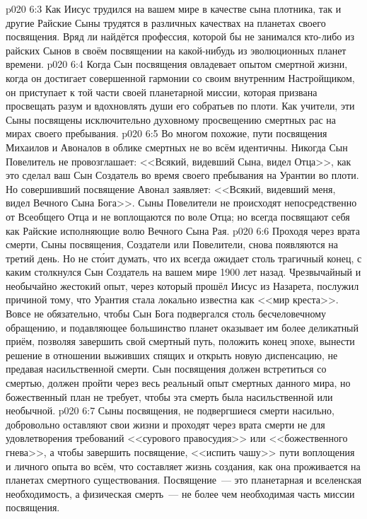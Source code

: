 \vs p020 6:3 Как Иисус трудился на вашем мире в качестве сына плотника, так и другие Райские Сыны трудятся в различных качествах на планетах своего посвящения. Вряд ли найдётся профессия, которой бы не занимался кто\hyp{}либо из райских Сынов в своём посвящении на какой\hyp{}нибудь из эволюционных планет времени.
\vs p020 6:4 Когда Сын посвящения овладевает опытом смертной жизни, когда он достигает совершенной гармонии со своим внутренним Настройщиком, он приступает к той части своей планетарной миссии, которая призвана просвещать разум и вдохновлять души его собратьев по плоти. Как учители, эти Сыны посвящены исключительно духовному просвещению смертных рас на мирах своего пребывания.
\vs p020 6:5 \pc Во многом похожие, пути посвящения Михаилов и Авоналов в облике смертных не во всём идентичны. Никогда Сын Повелитель не провозглашает: <<Всякий, видевший Сына, видел Отца>>, как это сделал ваш Сын Создатель во время своего пребывания на Урантии во плоти. Но совершивший посвящение Авонал заявляет: <<Всякий, видевший меня, видел Вечного Сына Бога>>. Сыны Повелители не происходят непосредственно от Всеобщего Отца и не воплощаются по воле Отца; но всегда посвящают себя как Райские  исполняющие волю Вечного Сына Рая.
\vs p020 6:6 \pc Проходя через врата смерти, Сыны посвящения, Создатели или Повелители, снова появляются на третий день. Но не ст\'оит думать, что их всегда ожидает столь трагичный конец, с каким столкнулся Сын Создатель на вашем мире 1900 лет назад. Чрезвычайный и необычайно жестокий опыт, через который прошёл Иисус из Назарета, послужил причиной тому, что Урантия стала локально известна как <<мир креста>>. Вовсе не обязательно, чтобы Сын Бога подвергался столь бесчеловечному обращению, и подавляющее большинство планет оказывает им более деликатный приём, позволяя завершить свой смертный путь, положить конец эпохе, вынести решение в отношении выживших спящих и открыть новую диспенсацию, не предавая насильственной смерти. Сын посвящения должен встретиться со смертью, должен пройти через весь реальный опыт смертных данного мира, но божественный план не требует, чтобы эта смерть была насильственной или необычной.
\vs p020 6:7 Сыны посвящения, не подвергшиеся смерти насильно, добровольно оставляют свои жизни и проходят через врата смерти не для удовлетворения требований <<сурового правосудия>> или <<божественного гнева>>, а чтобы завершить посвящение, <<испить чашу>> пути воплощения и личного опыта во всём, что составляет жизнь создания, как она проживается на планетах смертного существования. Посвящение~--- это планетарная и вселенская необходимость, а физическая смерть~--- не более чем необходимая часть миссии посвящения.
